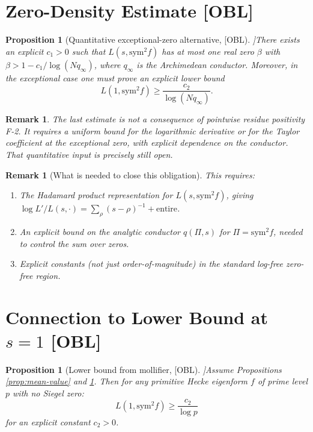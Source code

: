 \documentclass[12pt]{article}
\newtheorem{proposition}[theorem]{Proposition}
\newtheorem{remark}[theorem]{Remark}
\begin{document}
\section{Zero-Density Estimate [OBL]}

\begin{proposition}[Quantitative exceptional-zero alternative, [OBL]]\label{prop:zero-density}
There exists an explicit $c_1 > 0$ such that $L(s, \mathrm{sym}^2 f)$ has at most
one real zero $\beta$ with $\beta > 1 - c_1/\log(N q_\infty)$, where $q_\infty$
is the Archimedean conductor.  Moreover, in the exceptional case one must prove
an explicit lower bound
\[
  L(1,\mathrm{sym}^2 f)\ge \frac{c_2}{\log(N q_\infty)}.
\]
\end{proposition}

\begin{remark}
The last estimate is not a consequence of pointwise residue positivity F-2.
It requires a uniform bound for the logarithmic derivative or for the Taylor
coefficient at the exceptional zero, with explicit dependence on the conductor.
That quantitative input is precisely still open.
\end{remark}

\begin{remark}[What is needed to close this obligation]
This requires:
\begin{enumerate}
  \item The Hadamard product representation for $L(s, \mathrm{sym}^2 f)$,
        giving $\log L'/L(s,\cdot) = \sum_\rho (s-\rho)^{-1} + \text{entire}$.
  \item An explicit bound on the analytic conductor $q(\Pi, s)$ for $\Pi = \mathrm{sym}^2 f$,
        needed to control the sum over zeros.
  \item Explicit constants (not just order-of-magnitude) in the standard
        log-free zero-free region.
\end{enumerate}
\end{remark}

\section{Connection to Lower Bound at $s=1$ [OBL]}

\begin{proposition}[Lower bound from mollifier, [OBL]]\label{prop:lbound-from-mollifier}
Assume Propositions \ref{prop:mean-value} and \ref{prop:zero-density}.  Then
for any primitive Hecke eigenform $f$ of prime level $p$ with no Siegel zero:
\[
  L(1, \mathrm{sym}^2 f) \geq \frac{c_2}{\log p}
\]
for an explicit constant $c_2 > 0$.
\end{proposition}
\end{document}
